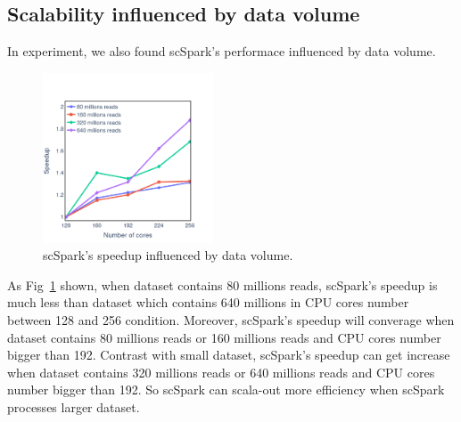 \documentclass[conference]{IEEEtran}
\begin{document}
\subsection{Scalability influenced by data volume}
In experiment, we also found scSpark's performace influenced by data volume.

\begin{figure}
	\includegraphics[width=0.45\textwidth]{fig6.pdf}
	\caption{scSpark's speedup influenced by data volume.} \label{fig6}
\end{figure}
As Fig~\ref{fig6} shown, when dataset contains 80 millions reads, scSpark's speedup is much less than dataset which contains 640 millions in CPU cores number between 128 and 256 condition.
Moreover, scSpark's speedup will converage when dataset contains 80 millions reads or 160 millions reads and CPU cores number bigger than 192.
Contrast with small dataset, scSpark's speedup can get increase when dataset contains 320 millions reads or 640 millions reads and CPU cores number bigger than 192.
So scSpark can scala-out more efficiency when scSpark processes larger dataset.
\end{document}
